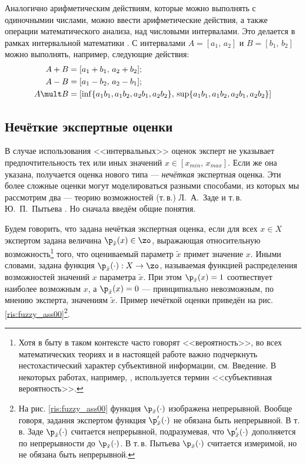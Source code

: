Аналогично арифметическим действиям, которые можно выполнять с одиночнымии числами, можно ввести арифметические действия, а также операции математического анализа, над числовыми интервалами. Это делается в рамках интервальной математики \cite{1,2}. С интервалами $A = [a_1,\,a_2]$ и $B = [b_1,\,b_2]$ можно выполнять, например, следующие действия:
\begin{equation*}
\begin{split}
 A + B &= [a_1+b_1,\,a_2+b_2];\\
 A - B &= [a_1-b_2,\,a_2-b_1];\\
 A \mult B &= [\inf\{a_1b_1,a_1b_2,a_2b_1,a_2b_2\},\,\sup\{a_1b_1,a_1b_2,a_2b_1,a_2b_2\}]
\end{split} 
\end{equation*}


\subsection{Нечёткие экспертные оценки}
 
В случае использования <<интервальных>> оценок эксперт не указывает предпочтительность тех или иных значений $x \in [x_{min},\,x_{max}]$. Если же она указана, получается оценка нового типа --- {\sl нечёткая} экспертная оценка. Эти более сложные оценки могут моделироваться разными способами, из которых мы рассмотрим два --- теорию возможностей (т.\,в.) Л.~А.~Заде \cite{3} и т.\,в. Ю.~П.~Пытьева \cite{4}. Но сначала введём общие понятия.

Будем говорить, что задана нечёткая экспертная оценка, если для всех $x \in X$ экспертом задана величина $\p_{\tilde x}(x) \in \zo$, выражающая относительную возможность\footnote{Хотя в быту в таком контексте часто говорят <<вероятность>>, во всех математических теориях и в настоящей работе важно подчеркнуть нестохастический характер субъективной информации, см. Введение. В некоторых работах, например, \cite{4_1}, используется термин <<субъективная вероятность>>.} того, что оцениваемый параметр $\tilde x$ примет значение $x$.
Иными словами, задана функция $\p_{\tilde x}(\cdot): X \rightarrow \zo$, называемая функцией распределения возможностей значений $x$ параметра $\tilde x$. При этом $\p_{\tilde x}(x) = 1$ соотвествует наиболее возможным $x$, а $\p_{\tilde x}(x) = 0$ --- принципиально невозможным, по мнению эксперта, значениям $\tilde x$. Пример нечёткой оценки приведён на рис. \ref{ris:fuzzy_ass00}\footnote{На рис. \ref{ris:fuzzy_ass00} функция $\p_{\tilde x}(\cdot)$ изображена непрерывной. Вообще говоря, задання экспертом функция $\p'_{\tilde x}(\cdot)$ не обязана быть непрерывной. В т.\,в. Заде $\p_{\tilde x}(\cdot)$ считается непрерывной, подразумевая, что $\p'_{\tilde x}(\cdot)$ дополняется по непрерывности до $\p_{\tilde x}(\cdot)$. В т.\,в. Пытьева $\p_{\tilde x}(\cdot)$ считается измеримой, но не обязана быть непрерывной.}.

